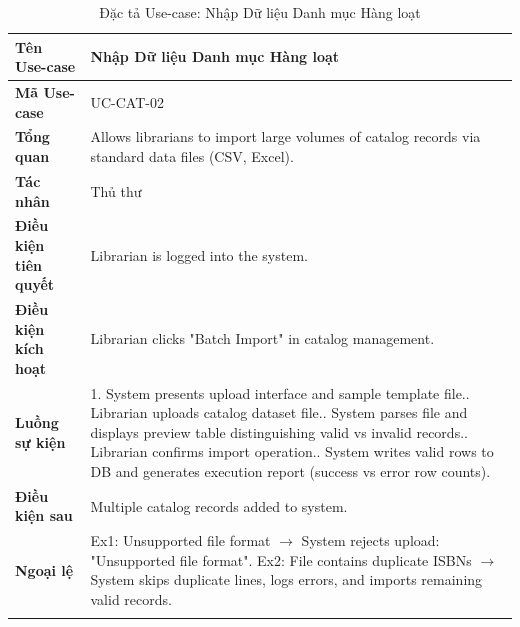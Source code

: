 \newpage
\begin{longtable}{|p{3.5cm}|p{11.5cm}|}
    \hline
    \textbf{Tên Use-case} & \textbf{Nhập Dữ liệu Danh mục Hàng loạt} \\
    \hline
    \textbf{Mã Use-case} & UC-CAT-02 \\
    \hline
    \textbf{Tổng quan} & Allows librarians to import large volumes of catalog records via standard data files (CSV, Excel). \\
    \hline
    \textbf{Tác nhân} & Thủ thư \\
    \hline
    \textbf{Điều kiện tiên quyết} & Librarian is logged into the system. \\
    \hline
    \textbf{Điều kiện kích hoạt} & Librarian clicks "Batch Import" in catalog management. \\
    \hline
    \textbf{Luồng sự kiện} & 
    1. System presents upload interface and sample template file.\newline
    2. Librarian uploads catalog dataset file.\newline
    3. System parses file and displays preview table distinguishing valid vs invalid records.\newline
    4. Librarian confirms import operation.\newline
    5. System writes valid rows to DB and generates execution report (success vs error row counts). \\
    \hline
    \textbf{Điều kiện sau} & Multiple catalog records added to system. \\
    \hline
    \textbf{Ngoại lệ} & 
    Ex1: Unsupported file format $\rightarrow$ System rejects upload: "Unsupported file format".\newline
    Ex2: File contains duplicate ISBNs $\rightarrow$ System skips duplicate lines, logs errors, and imports remaining valid records. \\
    \hline
    \caption{Đặc tả Use-case: Nhập Dữ liệu Danh mục Hàng loạt}
\end{longtable}

